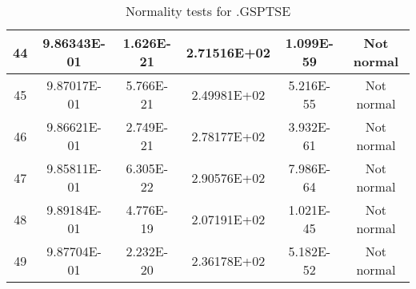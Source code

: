 \begin{table}[h]
\begin{tabular}{|c|c|c|c|c|c|}
		44 & 9.86343E-01 & 1.626E-21 & 2.71516E+02 & 1.099E-59 & Not normal\\\hline
		45 & 9.87017E-01 & 5.766E-21 & 2.49981E+02 & 5.216E-55 & Not normal\\\hline
		46 & 9.86621E-01 & 2.749E-21 & 2.78177E+02 & 3.932E-61 & Not normal\\\hline
		47 & 9.85811E-01 & 6.305E-22 & 2.90576E+02 & 7.986E-64 & Not normal\\\hline
		48 & 9.89184E-01 & 4.776E-19 & 2.07191E+02 & 1.021E-45 & Not normal\\\hline
		49 & 9.87704E-01 & 2.232E-20 & 2.36178E+02 & 5.182E-52 & Not normal\\\hline
	\end{tabular}
	\caption{Normality tests for .GSPTSE}
\end{table}
